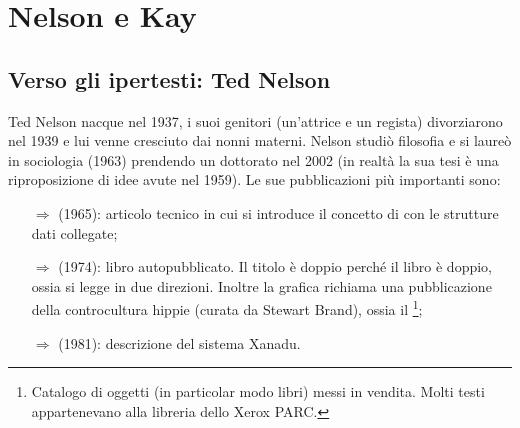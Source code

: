 \chapter{Nelson e Kay}

\section{Verso gli ipertesti: Ted Nelson}

Ted Nelson nacque nel 1937, i suoi genitori (un'attrice e un regista) divorziarono nel 1939 e lui venne cresciuto dai nonni
materni. Nelson studiò filosofia e si laureò in sociologia (1963) prendendo un dottorato nel 
2002 (in realtà la sua tesi è una riproposizione di idee avute nel 1959).
Le sue pubblicazioni più importanti sono:

\begin{itemize}
    \item [$\Rightarrow$]  (1965): 
    articolo tecnico in cui si introduce il concetto di  con le strutture dati collegate;
    \item [$\Rightarrow$]  (1974): libro autopubblicato.
    Il titolo è doppio perché il libro è doppio, ossia si legge in due direzioni.
    Inoltre la grafica richiama una pubblicazione della controcultura hippie (curata da Stewart Brand),
    ossia il \footnote{Catalogo di oggetti (in particolar modo libri)
    messi in vendita. Molti testi appartenevano alla libreria dello Xerox PARC.};
    \item [$\Rightarrow$]  (1981): descrizione del sistema Xanadu.
\end{itemize}



